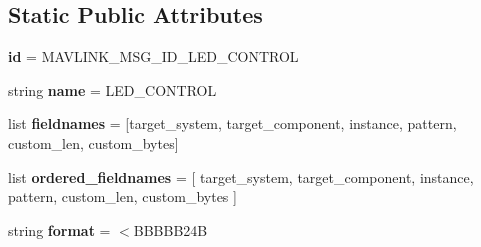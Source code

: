 \subsection*{Static Public Attributes}
\begin{DoxyCompactItemize}
\item 
\mbox{\label{classpymavlink_1_1dialects_1_1v10_1_1MAVLink__led__control__message_abbd7894173056a8d27740cb91f5fa6e2}} 
{\bfseries id} = M\+A\+V\+L\+I\+N\+K\+\_\+\+M\+S\+G\+\_\+\+I\+D\+\_\+\+L\+E\+D\+\_\+\+C\+O\+N\+T\+R\+OL
\item 
\mbox{\label{classpymavlink_1_1dialects_1_1v10_1_1MAVLink__led__control__message_a6fe3ddc6aeb3bbd178f646c57ba964c6}} 
string {\bfseries name} = \textquotesingle{}L\+E\+D\+\_\+\+C\+O\+N\+T\+R\+OL\textquotesingle{}
\item 
\mbox{\label{classpymavlink_1_1dialects_1_1v10_1_1MAVLink__led__control__message_a3a2ff4fa37b5ac1103c14feb3f0830ba}} 
list {\bfseries fieldnames} = \mbox{[}\textquotesingle{}target\+\_\+system\textquotesingle{}, \textquotesingle{}target\+\_\+component\textquotesingle{}, \textquotesingle{}instance\textquotesingle{}, \textquotesingle{}pattern\textquotesingle{}, \textquotesingle{}custom\+\_\+len\textquotesingle{}, \textquotesingle{}custom\+\_\+bytes\textquotesingle{}\mbox{]}
\item 
\mbox{\label{classpymavlink_1_1dialects_1_1v10_1_1MAVLink__led__control__message_a6a1ecd090a692c300f2b43f6e808c9e3}} 
list {\bfseries ordered\+\_\+fieldnames} = \mbox{[} \textquotesingle{}target\+\_\+system\textquotesingle{}, \textquotesingle{}target\+\_\+component\textquotesingle{}, \textquotesingle{}instance\textquotesingle{}, \textquotesingle{}pattern\textquotesingle{}, \textquotesingle{}custom\+\_\+len\textquotesingle{}, \textquotesingle{}custom\+\_\+bytes\textquotesingle{} \mbox{]}
\item 
\mbox{\label{classpymavlink_1_1dialects_1_1v10_1_1MAVLink__led__control__message_af4e3bec70cec8f9051590c60a17aae8f}} 
string {\bfseries format} = \textquotesingle{}$<$B\+B\+B\+B\+B24B\textquotesingle{}

\end{DoxyCompactItemize}
